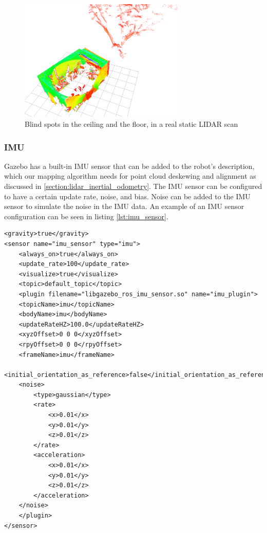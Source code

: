 \documentclass[12pt]{article}
\begin{document}
        \begin{figure}[H]
            \centering
            \includegraphics[width=0.7\textwidth]{Images/ldiar_scan_deadzone.png}
            \caption{Blind spots in the ceiling and the floor, in a real static LIDAR scan}
            \label{fig:real_lidar_scan}
        \end{figure}

        \subsubsection{IMU}

        Gazebo has a built-in IMU sensor that can be added to the robot's description, which our mapping algorithm needs for point cloud deskewing and alignment as discussed in \ref{section:lidar_inertial_odometry}. The IMU sensor can be configured to have a certain update rate, noise, and bias. Noise can be added to the IMU sensor to simulate the noise in the IMU data. An example of an IMU sensor configuration can be seen in listing \ref{lst:imu_sensor}.

    \vspace{10pt }
\begin{minipage}{0.9\textwidth}
\begin{lstlisting}[style=xmlStyle, caption={IMU Sensor Configuration}, label={lst:imu_sensor}]
<gravity>true</gravity>
<sensor name="imu_sensor" type="imu">
    <always_on>true</always_on>
    <update_rate>100</update_rate>
    <visualize>true</visualize>
    <topic>default_topic</topic>
    <plugin filename="libgazebo_ros_imu_sensor.so" name="imu_plugin">
    <topicName>imu</topicName>
    <bodyName>imu</bodyName>
    <updateRateHZ>100.0</updateRateHZ>
    <xyzOffset>0 0 0</xyzOffset>
    <rpyOffset>0 0 0</rpyOffset>
    <frameName>imu</frameName>
    <initial_orientation_as_reference>false</initial_orientation_as_reference>
    <noise>
        <type>gaussian</type>
        <rate>
            <x>0.01</x>
            <y>0.01</y>
            <z>0.01</z>
        </rate>
        <acceleration>
            <x>0.01</x>
            <y>0.01</y>
            <z>0.01</z>
        </acceleration>
    </noise>
    </plugin>
</sensor>
\end{lstlisting}
\end{minipage}
\end{document}
